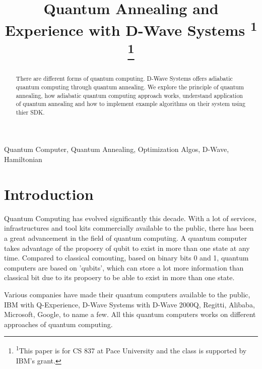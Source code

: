\documentclass[12pt,conference]{IEEEtran}
\makeatletter
\let\old@ps@headings\ps@headings
\let\old@ps@IEEEtitlepagestyle\ps@IEEEtitlepagestyle
\def\confheader#1{%
\def\ps@IEEEtitlepagestyle{%
\old@ps@IEEEtitlepagestyle%
\def\@oddhead{\strut\hfill#1\hfill\strut}%
\def\@evenhead{\strut\hfill#1\hfill\strut}%
}%
\ps@headings%
}
\makeatother
\begin{document}
\title{Quantum Annealing and Experience with D-Wave Systems \textsuperscript{1} \thanks{ \textsuperscript{1}This paper is for CS 837 at Pace University and the class is supported by IBM's grant.}}


\author{
}


\maketitle
\confheader{Proceedings of Student-Faculty Research Day Conference, CSIS, Pace University, May 3rd, 2019}

\begin{abstract}
There are different forms of quantum computing. D-Wave Systems offers adiabatic quantum computing through quantum annealing. We explore the principle of quantum annealing, how adiabatic quantum computing approach works, understand application of quantum annealing and how to implement example algorithms on their system using thier SDK.
\end{abstract}



\begin{IEEEkeywords}
Quantum Computer, Quantum Annealing, Optimization Algos, D-Wave, Hamiltonian
\end{IEEEkeywords}


\section{Introduction}
Quantum Computing has evolved significantly this decade. With a lot of services, infrastructures and tool kits commercially available to the public, there has been a great advancement in the field of quantum computing. A quantum computer takes advantage of the  propoery of qubit to exist in more than one state at any time. Compared to classical comouting, based on binary bits 0 and 1, quantum computers are based on 'qubits', which can store a lot more information than classical bit due to its propoery to be able to exist in more than one state. \cite{1}

Various companies have made their quantum computers available to the public, IBM with Q-Experience, D-Wave Systems with D-Wave 2000Q, Regitti, Alibaba, Microsoft, Google, to name a few. All this quantum computers works on different approaches of quantum computing.\cite{2}
\end{document}
